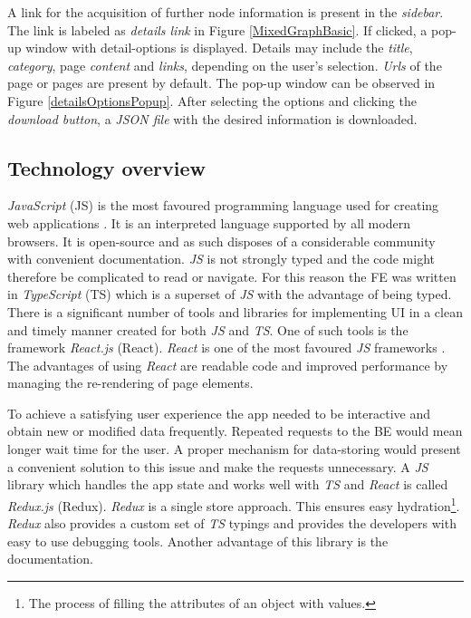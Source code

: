 A link for the acquisition of further node information is present in the \textit{sidebar}. The link is labeled as \textit{details link} in Figure \ref{MixedGraphBasic}. If clicked, a pop-up window with detail-options is displayed. Details may include the \textit{title}, \textit{category}, page \textit{content} and \textit{links}, depending on the user's selection. \textit{Urls} of the page or pages are present by default. The pop-up window can be observed in Figure \ref{detailsOptionsPopup}. After selecting the options and clicking the \textit{download button}, a \textit{JSON file} with the desired information is downloaded.

\subsection{Technology overview}
\textit{JavaScript} \cite{javaScript} (JS) is the most favoured programming language used for creating web applications \cite{jsGithut}. It is an interpreted language supported by all modern browsers. It is open-source and as such disposes of a considerable community with convenient documentation. \textit{JS} is not strongly typed and the code might therefore be complicated to read or navigate. For this reason the FE was written in \textit{TypeScript} (TS) \cite{typeScript} which is a superset of \textit{JS} with the advantage of being typed. There is a significant number of tools and libraries for implementing UI in a clean and timely manner created for both \textit{JS} and \textit{TS}. One of such tools is the framework \textit{React.js} \cite{react} (React). \textit{React} is one of the most favoured \textit{JS} frameworks \cite{reactPopularity}. The advantages of using \textit{React} are readable code and improved performance by managing the re-rendering of page elements.

To achieve a satisfying user experience the app needed to be interactive and obtain new or modified data frequently. Repeated requests to the BE would mean longer wait time for the user. A proper mechanism for data-storing would present a convenient solution to this issue and make the requests unnecessary. A \textit{JS} library which handles the app state and works well with \textit{TS} and \textit{React} is called \textit{Redux.js} \cite{redux} (Redux). \textit{Redux} is a single store approach. This ensures easy hydration\footnote{The process of filling the attributes of an object with values.}. \textit{Redux} also provides a custom set of \textit{TS} typings and provides the developers with easy to use debugging tools. Another advantage of this library is the documentation.

